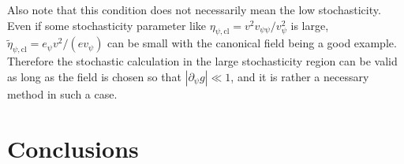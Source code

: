 \documentclass[aps, prd
, preprint
, nofootinbib 
, superscriptaddress
, longbibliography
]{revtex4-1}
\newcommand{\cl}{\text{cl}}
\begin{document}
Also note that this condition does not necessarily mean the low stochasticity. Even if some stochasticity parameter like $\eta_{\psi,\cl}=v^2v_{\psi\psi}/{v_\psi^2}$
is large, $\tilde{\eta}_{\psi,\cl}=e_\psi v^2/(ev_\psi)$ can be small with the canonical field being a good example.
Therefore the stochastic calculation in the large stochasticity region can be valid as long as the field is chosen so that $|\partial_\psi g|\ll1$,
and it is rather a necessary method in such a case. 








\section{Conclusions}

















\end{document}

